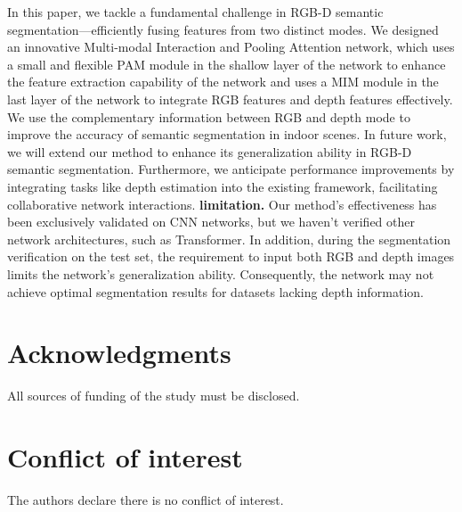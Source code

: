 \documentclass{aims}
\numberwithin{equation}{section}
\begin{document}
In this paper, we tackle a fundamental challenge in RGB-D semantic segmentation—efficiently fusing features from two distinct modes. We designed an innovative Multi-modal Interaction and Pooling Attention network, which uses a small and flexible PAM module in the shallow layer of the network to enhance the feature extraction capability of the network and uses a MIM module in the last layer of the network to integrate RGB features and depth features effectively. We use the complementary information between RGB and depth mode to improve the accuracy of semantic segmentation in indoor scenes. In future work, we will extend our method to enhance its generalization ability in RGB-D semantic segmentation. Furthermore, we anticipate performance improvements by integrating tasks like depth estimation into the existing framework, facilitating collaborative network interactions.
{\textbf{limitation.}} Our method's effectiveness has been exclusively validated on CNN networks, but we haven't verified other network architectures, such as Transformer. In addition, during the segmentation verification on the test set, the requirement to input both RGB and depth images limits the network's generalization ability. Consequently, the network may not achieve optimal segmentation results for datasets lacking depth information.




















\section*{Acknowledgments}

All sources of funding of the study must be disclosed.

\section*{Conflict of interest}

The authors declare there is no conflict of interest.






























 
  
\end{document}
